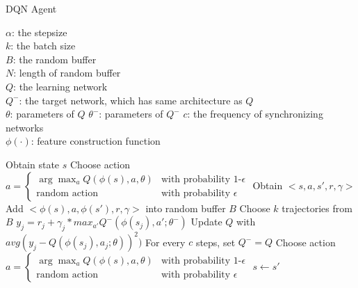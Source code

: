 \documentclass{article}
\begin{document}
\begin{algorithm}
\caption{DQN Agent}\label{dqn}

$\alpha$: the stepsize \\
$k$: the batch size\\
$B$: the random buffer \\
$N$: length of random buffer \\
$Q$: the learning network \\
$Q^-$: the target network, which has same architecture as $Q$ \\
$\theta$: parameters of $Q$
$\theta^-$: parameters of $Q^-$
$c$: the frequency of synchronizing networks \\
$\phi(\cdot)$: feature construction function\\

\begin{algorithmic}[1]

\State Obtain state $s$
\State Choose action $a = 
                        \begin{cases} 
                            \arg\!\max_{a} Q(\phi(s), a, \theta) & \text{with probability 1-$\epsilon$} \\
                            \text{random action} & \text{with probability $\epsilon$}
                        \end{cases}$    
    \State Obtain $<s, a, s', r, \gamma>$
    \State Add $<\phi(s), a, \phi(s'), r, \gamma>$ into random buffer $B$
    \State Choose $k$ trajectories from $B$
        \State $y_j = r_j + \gamma_j * max_{a'} Q^-(\phi(s_j), a'; \theta^-)$
    \EndFor
    \State Update $Q$ with $avg(y_j - Q(\phi(s_j), a_j; \theta))^2)$
    \State For every $c$ steps, set $Q^- = Q$
    \State Choose action $a = 
                        \begin{cases} 
                            \arg\!\max_{a} Q(\phi(s), a, \theta) & \text{with probability 1-$\epsilon$} \\
                            \text{random action} & \text{with probability $\epsilon$}
                        \end{cases}$
    \State $s \xleftarrow{} s'$
\EndWhile


\end{algorithmic}
\end{algorithm}
\end{document}

